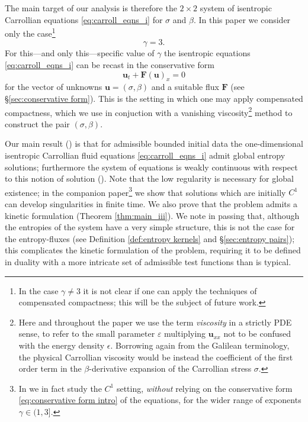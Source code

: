 \documentclass[11pt,a4paper,reqno]{amsart}
\numberwithin{equation}{section}
\theoremstyle{definition}
\theoremstyle{remark}
\newcommand{\bu}{\mathbf{u}}
\newcommand{\bF}{\mathbf{F}}
\begin{document}
The main target of our analysis is therefore the $2 \times 2$ system of isentropic Carrollian equations \eqref{eq:carroll_eqns_i} for $\sigma$ and $\beta$. In this paper we consider only the case\footnote{In the case $\gamma \neq 3$ it is not clear if one can apply the techniques of compensated compactness; this will be the subject of future work.}
\[ \gamma = 3. \]
For this---and only this---specific value of $\gamma$ the isentropic equations \eqref{eq:carroll_eqns_i} can be recast in the conservative form
\begin{equation}\label{eq:conservative form intro}
    \bu_t + \bF(\bu)_x = 0 
\end{equation}
for the vector of unknowns $\bu = (\sigma,\beta)$ and a suitable flux $\bF$ (see \S\ref{sec:conservative form}). This is the setting in which one may apply compensated compactness, which we use in conjuction with a vanishing viscosity\footnote{Here and throughout the paper we use the term \emph{viscosity} in a strictly PDE sense, to refer to the small parameter $\varepsilon$ multiplying $\bu_{xx}$ not to be confused with the energy density $\epsilon$. Borrowing again from the Galilean terminology, the physical Carrollian viscosity would be instead the coefficient of the first order term in the $\beta$-derivative expansion of the Carrollian stress $\sigma$.} method to construct the pair $(\sigma, \beta)$.


Our main result () is that for admissible bounded initial data the one-dimensional isentropic Carrollian fluid equations \eqref{eq:carroll_eqns_i} admit global entropy solutions; furthermore the system of equations is weakly continuous with respect to this notion of solution (). Note that the low regularity is necessary for global existence; in the companion paper\footnote{In \cite{AthanasiouPetropoulosSchulzTaujanskas24b} we in fact study the $C^1$ setting, \emph{without} relying on the conservative form \eqref{eq:conservative form intro} of the equations, for the wider range of exponents $\gamma \in (1, 3]$.} \cite{AthanasiouPetropoulosSchulzTaujanskas24b} we show that solutions which are initially $C^1$ can develop singularities in finite time. We also prove that the problem admits a kinetic formulation (Theorem \ref{thm:main_iii}). We note in passing that, although the entropies of the system have a very simple structure, this is not the case for the entropy-fluxes (see Definition \ref{def:entropy kernels} and \S \ref{sec:entropy pairs}); this complicates the kinetic formulation of the problem, requiring it to be defined in duality with a more intricate set of admissible test functions than is typical.
\end{document}
